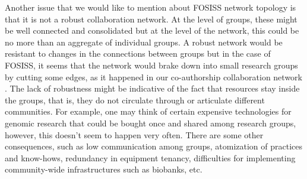 \documentclass[11pt]{article}
\begin{document}
  Another issue that we would like to mention about FOSISS
  network topology is that it is not a robust collaboration network.
  At the level of groups, these might be well connected and
  consolidated but at the level of the network, this could be no more
  than an aggregate of individual groups. A robust network would be
  resistant to changes in the connections between groups but in the
  case of FOSISS, it seems that the network would brake down into
  small research groups by cutting some edges, as it happened in our
  co-authorship collaboration network \cite{HernandezLemus2013}. The
  lack of robustness might be indicative of the fact that resources
  stay inside the groups, that is, they do not circulate through or
  articulate different communities. For example, one may think of
  certain expensive technologies for genomic research that could be
  bought once and shared among research groups, however, this doesn't
  seem to happen very often. There are some other consequences, such
  as low communication among groups, atomization of practices and
  know-hows, redundancy in equipment tenancy, difficulties for
  implementing community-wide infrastructures such as biobanks,
  etc. \\

\end{document}
